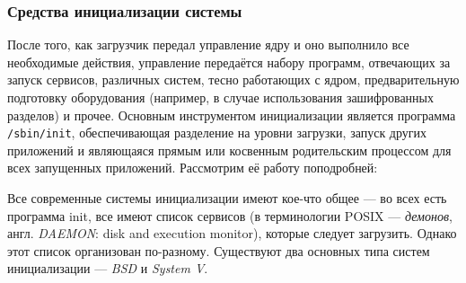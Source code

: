  \subsubsection{Средства инициализации системы}
 После того, как загрузчик передал управление ядру и оно выполнило все необходимые действия, управление передаётся набору программ, отвечающих за запуск сервисов, различных систем, тесно работающих с ядром, предварительную подготовку оборудования (например, в случае использования зашифрованных разделов) и прочее.
 Основным инструментом инициализации является программа \texttt{/sbin/init}, обеспечивающая разделение на уровни загрузки, запуск других приложений и являющаяся прямым или косвенным родительским процессом для всех запущенных приложений. Рассмотрим её работу поподробней:
  
 Все современные системы инициализации имеют кое-что общее --- во всех есть программа init, все имеют список сервисов (в терминологии POSIX --- \emph{демонов}, англ. \emph{DAEMON}: disk and execution monitor), которые следует загрузить. Однако этот список организован по-разному. Существуют два основных типа систем инициализации --- \emph{BSD} и \emph{System V}.
  

